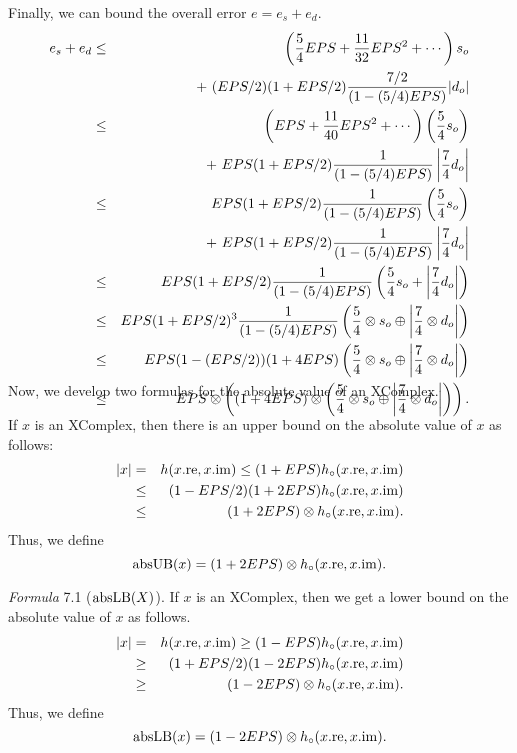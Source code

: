 Finally, we can bound the overall error $e = e_s + e_d$.
\begin{eqnarray*}
e_s + e_d&\le& \left({5 \over 4} EPS + {11 \over 32} EPS^2 +\cdots\right) s_o\\
&& +\
 (EPS/2) (1+EPS/2)
 {7/2 \over (1 - (5/4)EPS)}|d_o|\\
&\le& \left( EPS + {11 \over 40} EPS^2 +\cdots\right) \left({5 \over 4} s_o\right) \\
&&+\
 EPS (1+EPS/2)
 {1 \over (1 - (5/4)EPS)}\left|{7 \over 4} d_o\right|\\
&\le& EPS (1+EPS/2)
 {1 \over (1 - (5/4)EPS)} \left({5 \over 4} s_o\right) \\
&&+
\  EPS (1+EPS/2)
 {1 \over (1 - (5/4)EPS)}\left|{7 \over 4} d_o\right|\\
&\le& EPS (1+EPS/2)
 {1 \over (1 - (5/4)EPS)}
\left({5 \over 4} s_o +\left|{7 \over 4} d_o\right|\right)\\
&\le& EPS (1+EPS/2)^3
 {1 \over (1 - (5/4)EPS)}
\left({5 \over 4} \otimes s_o \oplus \left|{7 \over 4} \otimes d_o\right|\right)\\
&\le& EPS (1 - (EPS/2))(1 + 4 EPS) 
\left({5 \over 4} \otimes s_o \oplus \left|{7 \over 4} \otimes d_o\right|\right)\\
&\le& EPS \otimes \left((1 + 4 EPS) \otimes
\left({5 \over 4} \otimes s_o \oplus \left|{7 \over 4} \otimes d_o\right|\right)\right).\\
\noalign{\vskip-36pt}
\end{eqnarray*}
\enddemo
 
Now, we develop two formulas for the absolute value of an XComplex.
 

If $x$ is an XComplex, then
there is an upper bound on the absolute value of $x$ as follows:
\begin{eqnarray*}
|x| &=& h(x.{\rm re},x.{\rm im}) \le (1 + EPS) h_{\circ} (x.{\rm re},x.{\rm im})\\
&\le& (1 - EPS/2) (1 + 2EPS)h_{\circ} (x.{\rm re},x.{\rm im}) \\
&\le& (1 + 2EPS) \otimes h_{\circ} (x.{\rm re},x.{\rm im}).
\end{eqnarray*}
Thus, we define 
$${\rm absUB}(x) = (1 + 2EPS) \otimes h_{\circ} (x.{\rm re},x.{\rm im}).$$ 
\enddemo

{\it Formula} 7.1 (${\rm absLB}(X)$).
If $x$ is an XComplex, then
we get a lower bound on the absolute value of $x$ as follows.
\begin{eqnarray*}
|x|& =& h(x.{\rm re},x.{\rm im}) \ge (1 - EPS) h_{\circ} (x.{\rm re},x.{\rm im})\\
&\ge& (1 + EPS/2) (1 - 2EPS) h_{\circ} (x.{\rm
re},x.{\rm im})\\
&\ge& (1 - 2EPS) \otimes h_{\circ} (x.{\rm re},x.{\rm im}).
\end{eqnarray*}
Thus, we define 
$${\rm absLB}(x) = (1 - 2EPS) \otimes h_{\circ} (x.{\rm re},x.{\rm im}).$$ 
\vglue12pt

